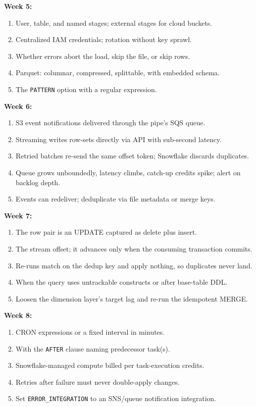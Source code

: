 \documentclass[11pt, a4paper]{article}
\begin{document}
\noindent\textbf{Week 5:}
\begin{enumerate}[nosep, leftmargin=6mm]
    \item User, table, and named stages; external stages for cloud buckets.
    \item Centralized IAM credentials; rotation without key sprawl.
    \item Whether errors abort the load, skip the file, or skip rows.
    \item Parquet: columnar, compressed, splittable, with embedded schema.
    \item The \texttt{PATTERN} option with a regular expression.
\end{enumerate}
\noindent\textbf{Week 6:}
\begin{enumerate}[nosep, leftmargin=6mm]
    \item S3 event notifications delivered through the pipe's SQS queue.
    \item Streaming writes row-sets directly via API with sub-second latency.
    \item Retried batches re-send the same offset token; Snowflake discards duplicates.
    \item Queue grows unboundedly, latency climbs, catch-up credits spike; alert on backlog depth.
    \item Events can redeliver; deduplicate via file metadata or merge keys.
\end{enumerate}
\noindent\textbf{Week 7:}
\begin{enumerate}[nosep, leftmargin=6mm]
    \item The row pair is an UPDATE captured as delete plus insert.
    \item The stream offset; it advances only when the consuming transaction commits.
    \item Re-runs match on the dedup key and apply nothing, so duplicates never land.
    \item When the query uses untrackable constructs or after base-table DDL.
    \item Loosen the dimension layer's target lag and re-run the idempotent MERGE.
\end{enumerate}
\noindent\textbf{Week 8:}
\begin{enumerate}[nosep, leftmargin=6mm]
    \item CRON expressions or a fixed interval in minutes.
    \item With the \texttt{AFTER} clause naming predecessor task(s).
    \item Snowflake-managed compute billed per task-execution credits.
    \item Retries after failure must never double-apply changes.
    \item Set \texttt{ERROR\_INTEGRATION} to an SNS/queue notification integration.
\end{enumerate}
\end{document}
